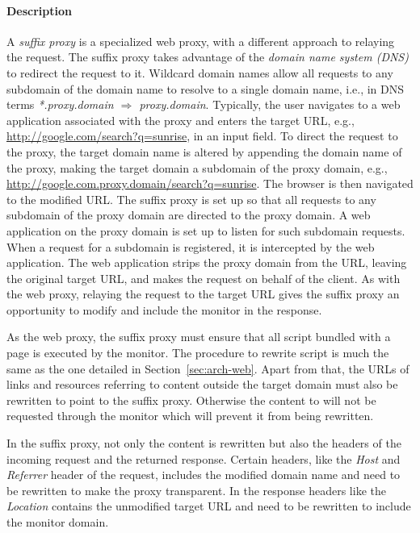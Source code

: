 \documentclass{llncs}
\newcommand{\todo}[1]{\colorbox{red}{\textcolor{white}{\sffamily\bfseries\scriptsize TODO}} \textcolor{red}{#1} \textcolor{red}{$\blacktriangleleft$}}
\begin{document}
\paragraph{Description}
A \emph{suffix proxy} is a specialized web proxy, with a different approach to relaying the request. 
The suffix proxy takes advantage of the \emph{domain name system (DNS)} to redirect the request to it.
Wildcard domain names allow all requests to any subdomain of the domain name to resolve to a single domain name, 
i.e., in DNS terms \emph{*.proxy.domain $\Rightarrow$ proxy.domain}.
Typically, the user navigates to a 
web application associated with the proxy and enters the target URL, e.g., \url{http://google.com/search?q=sunrise}, in 
an input field. To direct the request to the proxy, the target domain name is altered
by appending the domain name of the proxy, making the target domain a subdomain of the proxy domain, e.g., \url{http://google.com.proxy.domain/search?q=sunrise}. 
The browser is then navigated to the modified URL.
The suffix proxy is set up so
that all requests to any subdomain of the proxy domain are directed to the proxy domain. 
A web application on the proxy domain is set up to listen for such subdomain requests.
When a request for a subdomain is registered, it is intercepted by the web application.
The web application strips the proxy domain from the URL, leaving the original target URL, 
and makes the request on behalf of the client. As with the web proxy, 
relaying the request to the target URL gives the suffix proxy an opportunity to modify and 
include the monitor in the response.

As the web proxy, the suffix proxy must ensure that all script bundled with a 
page is executed by the monitor. The procedure to rewrite script is much the same as the one
detailed in Section~\ref{sec:arch-web}. Apart from that, the URLs of links and 
resources referring to content outside the target domain must also be rewritten to point to the suffix proxy. 
Otherwise the content to will not be requested through the monitor which will 
prevent it from being rewritten.


In the suffix proxy, not only the content is rewritten
but also the headers of the incoming request and the returned response.
Certain headers, like the \emph{Host} and \emph{Referrer} header of the request, includes the 
modified domain name and need to be rewritten to make the proxy transparent. In 
the response headers like the \emph{Location} contains the unmodified target URL and 
need to be rewritten to include the monitor domain. 
\end{document}
